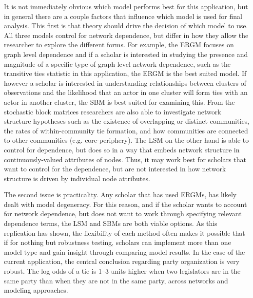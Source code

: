 \documentclass[fleqn,12pt]{wlscirep}
\begin{document}
It is not immediately obvious which model performs best for this application, but in general there are a couple factors that influence which model is used for final analysis. This first is that theory should drive the decision of which model to use. All three models control for network dependence, but differ in how they allow the researcher to explore the different forms. For example, the ERGM focuses on graph level dependence and if a scholar is interested in studying the presence and magnitude of a specific type of graph-level network dependence, such as the transitive ties statistic in this application, the ERGM is the best suited model. If however a scholar is interested in understanding relationships between clusters of observations and the likelihood that an actor in one cluster will form ties with an actor in another cluster, the SBM is best suited for examining this. From the stochastic block matrices researchers are also able to investigate network structure hypotheses such as the existence of overlapping or distinct communities, the rates of within-community tie formation, and how communities are connected to other communities (e.g. core-periphery). The LSM on the other hand is able to control for dependence, but does so in a way that embeds network structure in continuously-valued attributes of nodes. Thus, it may work best for scholars that want to control for the dependence, but are not interested in how network structure is driven by individual node attributes. 

The second issue is practicality. Any scholar that has used ERGMs, has likely dealt with model degeneracy. For this reason, and if the scholar wants to account for network dependence, but does not want to work through specifying relevant dependence terms, the LSM and SBMs are both viable options. As this replication has shown, the flexibility of each method often makes it possible that if for nothing but robustness testing, scholars can implement more than one model type and gain insight through comparing model results. In the case of the current application, the central conclusion regarding party organization is very robust. The log odds of a tie is 1--3 units higher when two legislators are in the same party than when they are not in the same party, across networks and modeling approaches.
\end{document}
